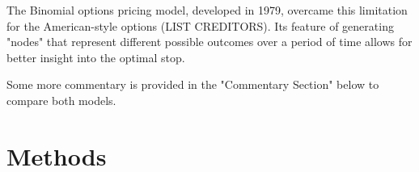 \documentclass[12pt, letterpaper]{article}
\begin{document}
The Binomial options pricing model, developed in 1979, overcame this limitation for the American-style options (LIST CREDITORS).
Its feature of generating "nodes" that represent different possible outcomes over a period of time allows for better insight into the optimal stop.

Some more commentary is provided in the "Commentary Section" below to compare both models.


\section{Methods}
\end{document}
